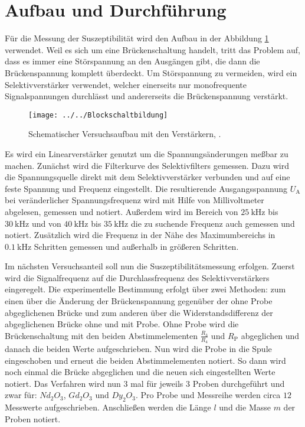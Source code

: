 \section{Aufbau und Durchführung}
\label{sec:Durchführung}
Für die Messung der Suszeptibilität wird den Aufbau in der Abbildung \ref{fig:blockschaltbildung} verwendet. Weil es sich um eine Brückenschaltung handelt, tritt das Problem auf, dass es immer eine Störspannung an den Ausgängen gibt, die dann die Brückenspannung komplett überdeckt. Um Störspannung zu vermeiden, wird ein Selektivverstärker verwendet, welcher einerseits nur monofrequente Signalspannungen durchlässt und andererseits die Brückenspannung verstärkt.

\begin{figure}[h!]
	\centering
	\texttt{[image: ../../Blockschaltbildung]}
	\caption{Schematischer Versuchsaufbau mit den Verstärkern, \cite[12]{anleitung606}.}
	\label{fig:blockschaltbildung}
\end{figure}

Es wird ein Linearverstärker genutzt um die Spannungsänderungen meßbar zu machen. Zunächst wird die Filterkurve des Selektivfilters gemessen. Dazu wird die Spannungsquelle direkt mit dem Selektivverstärker verbunden und auf eine feste Spannung und Frequenz eingestellt. 
Die resultierende Ausgangsspannung $U_\text{A}$ bei veränderlicher Spannungsfrequenz wird mit Hilfe von Millivoltmeter abgelesen, gemessen und notiert. Außerdem wird im Bereich von $\SI{25}{\kilo\hertz}$ bis $\SI{30}{\kilo\hertz}$ und von $\SI{40}{\kilo\hertz}$ bis $\SI{35}{\kilo\hertz}$ die zu suchende Frequenz auch gemessen und notiert. Zusätzlich wird die Frequenz in der Nähe des Maximumbereichs in $\SI{0,1}{\kilo\hertz}$ Schritten gemessen und außerhalb in größeren Schritten. 

Im nächsten Versuchsanteil soll nun die Suszeptibilitätsmessung erfolgen. Zuerst wird die Signalfrequenz auf die Durchlassfrequenz des Selektivverstärkers eingeregelt. Die experimentelle Bestimmung erfolgt über zwei Methoden: zum einen über die Änderung der Brückenspannung gegenüber der ohne Probe abgeglichenen Brücke und zum anderen über die Widerstandsdifferenz der abgeglichenen Brücke ohne und mit Probe. Ohne Probe wird die Brückenschaltung mit den beiden Abstimmelementen $\frac{R_3}{R_4}$ und $R_\text{P}$ abgeglichen und danach die beiden Werte aufgeschrieben. Nun wird die Probe in die Spule eingeschoben und erneut die beiden Abstimmelementen notiert. So dann wird noch einmal die Brücke abgeglichen und die neuen sich eingestellten Werte notiert. Das Verfahren wird nun $3$ mal für jeweils $3$ Proben durchgeführt und zwar für: $Nd_2O_3$, $Gd_2O_3$ und $Dy_2O_3$. Pro Probe und Messreihe werden circa $12$ Messwerte aufgeschrieben. Anschließen werden die Länge $l$ und die Masse $m$ der Proben notiert. 